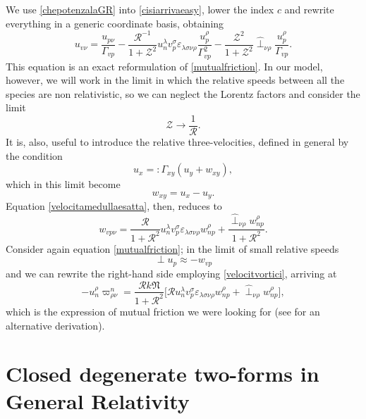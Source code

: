 \documentclass[usenatbib%
]{mnras}
\begin{document}
We use \eqref{chepotenzalaGR} into \eqref{cisiarrivaeasy}, lower the index $c$ and rewrite everything in a generic coordinate basis, obtaining
\begin{equation}\label{velocitamedullaesatta}
u_{v\nu} = \dfrac{u_{p\nu}}{\Gamma_{vp}} - \dfrac{\mathcal{R}^{-1}}{1+\mathcal{Z}^2} u_n^\lambda v_p^\sigma \varepsilon_{\lambda \sigma \nu \rho} \dfrac{u_p^\rho}{\Gamma_{vp}^2} - \dfrac{\mathcal{Z}^2}{1+\mathcal{Z}^2} \hat{\perp}_{\nu \rho} \dfrac{u_p^\rho}{\Gamma_{vp}}.
\end{equation}
This equation is an exact reformulation of \eqref{mutualfriction}. In our model, however, we will work in the limit in which the relative speeds between all the species are non relativistic, so we can neglect the Lorentz factors and consider the limit
\begin{equation}
\mathcal{Z} \longrightarrow \dfrac{1}{\mathcal{R}}.
\end{equation}
It is, also, useful to introduce the relative three-velocities, defined in general by the condition
\begin{equation}
u_x =: \Gamma_{xy}(u_y + w_{xy}),
\end{equation}
which in this limit become
\begin{equation}
w_{xy}=u_x - u_y.
\end{equation}
Equation \eqref{velocitamedullaesatta}, then, reduces to
\begin{equation}\label{velocitvortici}
w_{vp\nu} = \dfrac{\mathcal{R}}{1+\mathcal{R}^2} u_n^\lambda v_p^\sigma \varepsilon_{\lambda \sigma \nu \rho} w_{np}^\rho + \dfrac{\hat{\perp}_{\nu \rho}w_{np}^\rho}{1+\mathcal{R}^2} .
\end{equation}
Consider again equation \eqref{mutualfriction}; in the limit of small relative speeds
\begin{equation}
{\perp} u_p \approx -w_{vp} 
\end{equation}
and we can rewrite the right-hand side employing \eqref{velocitvortici}, arriving at
\begin{equation}
-u_n^\rho \varpi^n_{\rho \nu} = \dfrac{\mathcal{R}k\mathfrak{N}}{1+\mathcal{R}^2} \bigg[  \mathcal{R} u_n^\lambda v_p^\sigma \varepsilon_{\lambda \sigma \nu \rho} w_{np}^\rho + \hat{\perp}_{\nu \rho}w_{np}^\rho  \bigg],
\end{equation}
which is the expression of mutual friction we were looking for (see \citealt{Andersson_Mutual_Friction_2016} for an alternative derivation).


\section{Closed degenerate two-forms in General Relativity}\label{CDTFIGRSPTM}
\end{document}

